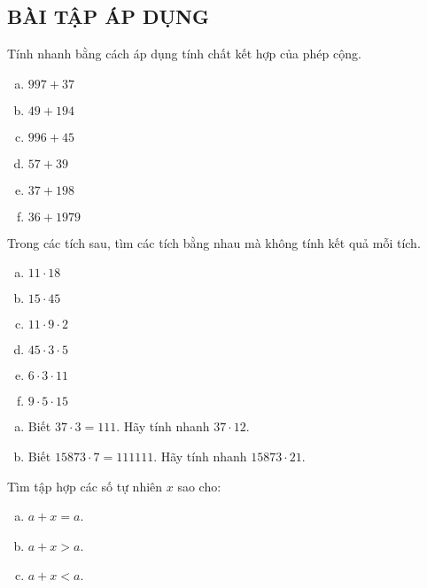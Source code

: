 \subsection{BÀI TẬP ÁP DỤNG}
\begin{bt}
Tính nhanh bằng cách áp dụng tính chất kết hợp của phép cộng.
\begin{multicols}{2}
\begin{enumerate}[a)]
\item $997+37$
\item $49+ 194$ 
\item $996+ 45$
\item $57+ 39$	
\item $37+ 198$
\item $36 + 1979$
\end{enumerate}
\end{multicols}
\end{bt}   \begin{bt}
Trong các tích sau, tìm các tích bằng nhau mà không tính kết quả mỗi tích.
\begin{multicols}{2}
\begin{enumerate}[a)]
\item $11\cdot 18$ 	
\item $15\cdot 45$ 	
\item $11\cdot 9\cdot 2$ 
\item $45\cdot 3\cdot 5$ 	
\item $6\cdot 3\cdot 11$ 	
\item $9\cdot 5\cdot 15$ 
\end{enumerate}		
\end{multicols}
\end{bt}   \begin{bt} \qquad
\begin{enumerate}[a)]
\item Biết $37\cdot 3=111$. Hãy tính nhanh $37\cdot 12$.
\item Biết $15873\cdot 7=111111$. Hãy tính nhanh $15873\cdot 21$. 
\end{enumerate}
\end{bt}   \begin{bt}
Tìm tập hợp các số tự nhiên $x$ sao cho:
\begin{enumerate}[a)]
\item $a + x = a$.
\item $a + x > a$.
\item $a + x < a$.
\end{enumerate}

\end{bt}
